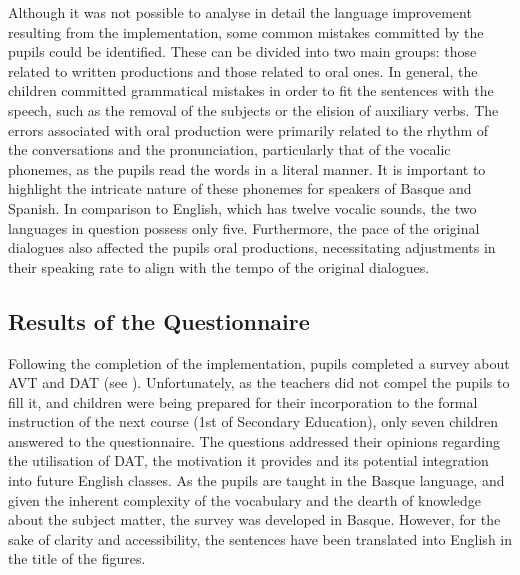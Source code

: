 Although it was not possible to analyse in detail the language
improvement resulting from the implementation, some common mistakes
committed by the pupils could be identified. These can be divided into
two main groups: those related to written productions and those related
to oral ones. In general, the children committed grammatical mistakes in
order to fit the sentences with the speech, such as the removal of the
subjects or the elision of auxiliary verbs. The errors associated with
oral production were primarily related to the rhythm of the
conversations and the pronunciation, particularly that of the vocalic
phonemes, as the pupils read the words in a literal manner. It is
important to highlight the intricate nature of these phonemes for
speakers of Basque and Spanish. In comparison to English, which has
twelve vocalic sounds, the two languages in question possess only five.
Furthermore, the pace of the original dialogues also affected the
pupils\textquotesingle{} oral productions, necessitating adjustments in
their speaking rate to align with the tempo of the original dialogues.

\subsection{Results of the Questionnaire}\label{sub-sec-resultsofthequestionnaire}

Following the completion of the implementation, pupils completed a
survey about AVT and DAT (see ). Unfortunately, as the teachers
did not compel the pupils to fill it, and children were being prepared
for their incorporation to the formal instruction of the next course
(1st of Secondary Education), only seven children answered to the
questionnaire. The questions addressed their opinions regarding the
utilisation of DAT, the motivation it provides and its potential
integration into future English classes. As the pupils are taught in the
Basque language, and given the inherent complexity of the vocabulary and
the dearth of knowledge about the subject matter, the survey was
developed in Basque. However, for the sake of clarity and accessibility,
the sentences have been translated into English in the title of the
figures.

